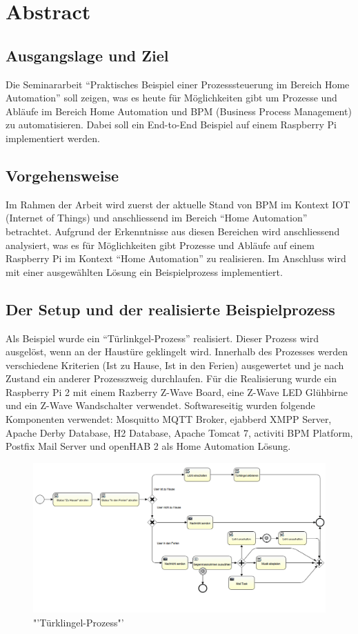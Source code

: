 
\section*{Abstract}

\subsection*{Ausgangslage und Ziel}
Die Seminararbeit "`Praktisches Beispiel einer Prozesssteuerung im Bereich Home Automation"' soll zeigen, was es heute für Möglichkeiten gibt um Prozesse und Abläufe im Bereich Home Automation und BPM (Business Process Management) zu automatisieren. Dabei soll ein End-to-End Beispiel auf einem Raspberry Pi implementiert werden.

\subsection*{Vorgehensweise}
Im Rahmen der Arbeit wird zuerst der aktuelle Stand von BPM im Kontext IOT (Internet of Things) und anschliessend im Bereich "`Home Automation"' betrachtet. Aufgrund der Erkenntnisse aus diesen Bereichen wird anschliessend analysiert, was es für Möglichkeiten gibt Prozesse und Abläufe auf einem Raspberry Pi im Kontext "`Home Automation"' zu realisieren. Im Anschluss wird mit einer ausgewählten Lösung ein Beispielprozess implementiert.

\subsection*{Der Setup und der realisierte Beispielprozess}
Als Beispiel wurde ein "`Türlinkgel-Prozess"' realisiert. Dieser Prozess wird ausgelöst, wenn an der Haustüre geklingelt wird. Innerhalb des Prozesses werden verschiedene Kriterien (Ist zu Hause, Ist in den Ferien) ausgewertet und je nach Zustand ein anderer Prozesszweig durchlaufen. Für die Realisierung wurde ein Raspberry Pi 2 mit einem Razberry Z-Wave Board, eine Z-Wave LED Glühbirne und ein Z-Wave Wandschalter verwendet. Softwareseitig wurden folgende Komponenten verwendet: Mosquitto MQTT Broker, ejabberd XMPP Server, Apache Derby Database, H2 Database, Apache Tomcat 7, activiti BPM Platform, Postfix Mail Server und openHAB 2 als Home Automation Lösung.

\begin{figure}[H]
  \includegraphics[width=14cm]{./images/DoorBellProcess}  \caption{"'Türklingel-Prozess"'}\label{img:AnalyseRpi:DoorbellProcess}
\end{figure}
